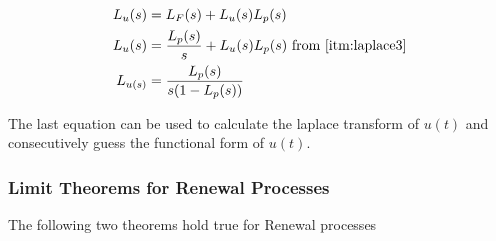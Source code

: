 \documentclass[../probability-notes.tex]{subfiles}
\begin{document}
    \begin{align*}
        L_{u}(s) &= L_{F}(s) + L_{u}(s) L_{p}(s)\\
        L_{u}(s) &= \frac{L_{p}(s)}{s} + L_{u}(s) L_{p}(s) \text{ from \ref{itm:laplace3}}\\
        L_{u(s)} &= \frac{L_{p}(s)}{s(1-L_{p}(s))}
    \end{align*}

    The last equation can be used to calculate the laplace transform of $u(t)$ and consecutively guess the functional form of $u(t)$.

    \subsubsection{Limit Theorems for Renewal Processes}
    The following two theorems hold true for Renewal processes
\end{document}
